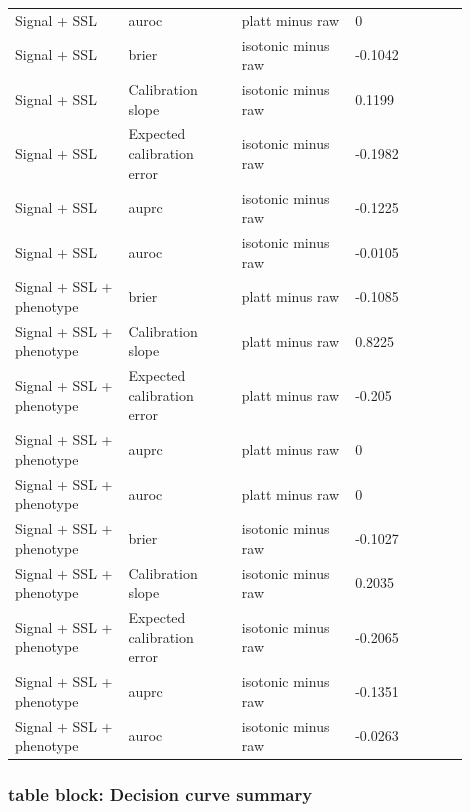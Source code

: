 \documentclass[utf8]{frontiers_suppmat}
\begin{document}
\begin{landscape}
\begin{longtable}{L{0.225\linewidth} L{0.225\linewidth} L{0.225\linewidth} L{0.225\linewidth}}
Signal + SSL & auroc & platt minus raw & 0 \\
Signal + SSL & brier & isotonic minus raw & -\allowbreak{}0.\allowbreak{}1042 \\
Signal + SSL & Calibration slope & isotonic minus raw & 0.\allowbreak{}1199 \\
Signal + SSL & Expected calibration error & isotonic minus raw & -\allowbreak{}0.\allowbreak{}1982 \\
Signal + SSL & auprc & isotonic minus raw & -\allowbreak{}0.\allowbreak{}1225 \\
Signal + SSL & auroc & isotonic minus raw & -\allowbreak{}0.\allowbreak{}0105 \\
Signal + SSL + phenotype & brier & platt minus raw & -\allowbreak{}0.\allowbreak{}1085 \\
Signal + SSL + phenotype & Calibration slope & platt minus raw & 0.\allowbreak{}8225 \\
Signal + SSL + phenotype & Expected calibration error & platt minus raw & -\allowbreak{}0.\allowbreak{}205 \\
Signal + SSL + phenotype & auprc & platt minus raw & 0 \\
Signal + SSL + phenotype & auroc & platt minus raw & 0 \\
Signal + SSL + phenotype & brier & isotonic minus raw & -\allowbreak{}0.\allowbreak{}1027 \\
Signal + SSL + phenotype & Calibration slope & isotonic minus raw & 0.\allowbreak{}2035 \\
Signal + SSL + phenotype & Expected calibration error & isotonic minus raw & -\allowbreak{}0.\allowbreak{}2065 \\
Signal + SSL + phenotype & auprc & isotonic minus raw & -\allowbreak{}0.\allowbreak{}1351 \\
Signal + SSL + phenotype & auroc & isotonic minus raw & -\allowbreak{}0.\allowbreak{}0263 \\
\end{longtable}
\normalsize
\end{landscape}


\subsubsection*{table block: Decision curve summary}
\end{document}
